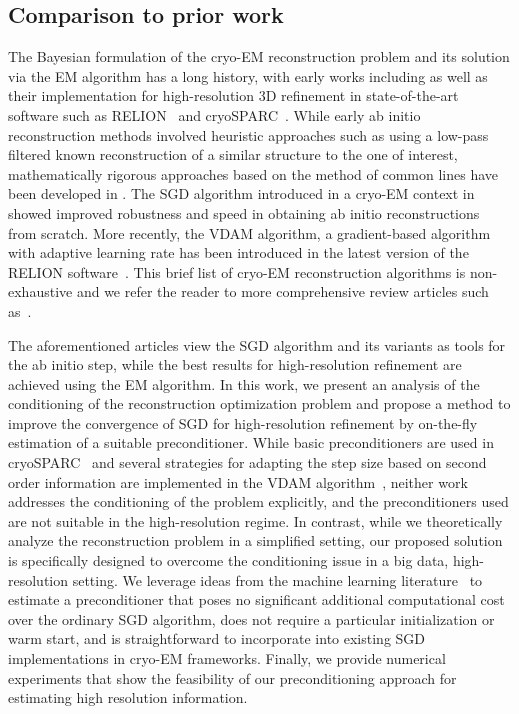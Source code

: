 \documentclass{article}
\begin{document}
\subsection{Comparison to prior work}
The Bayesian formulation of the cryo-EM reconstruction problem and its solution via the EM algorithm has a long history, with early works including \cite{sigworth_maximum-likelihood_1998,tagare_fast_2008,tagare_adaptive_2010} as well as their implementation for high-resolution 3D refinement in state-of-the-art software such as RELION~\cite{scheres_relion_2012,scheres_bayesian_2012} and cryoSPARC~\cite{punjani_cryosparc_2017}.
While early ab initio reconstruction methods involved heuristic approaches such as using a low-pass filtered known reconstruction of a similar structure to the one of interest, mathematically rigorous approaches based on the method of common lines have been developed in \cite{singer_three-dimensional_2011,shkolnisky_viewing_2012,greenberg_common_2017}.
The SGD algorithm introduced in a cryo-EM context in \cite{punjani_building_2017,punjani_cryosparc_2017} showed improved robustness and speed in obtaining ab initio reconstructions from scratch.
More recently, the VDAM algorithm, a gradient-based algorithm with adaptive learning
rate has been introduced in the latest version of the RELION software~\cite{kimanius_new_2021}.
This brief list of cryo-EM reconstruction algorithms is non-exhaustive and we refer the reader to more comprehensive review articles such as~\cite{singer_computational_2020,bendory_single-particle_2020}.

The aforementioned articles view the SGD algorithm and its variants as tools for the ab initio step, while the best results for high-resolution refinement are achieved using the EM algorithm.
In this work, we present an analysis of the conditioning of the reconstruction optimization problem and propose a method to improve the convergence of SGD for high-resolution refinement by on-the-fly estimation of a suitable preconditioner.
While basic preconditioners are used in cryoSPARC~\cite{punjani_cryosparc_2017} and several strategies for adapting the step size based on second order information are implemented in the VDAM algorithm~\cite{kimanius_new_2021}, neither work addresses the conditioning of the problem explicitly, and the preconditioners used are not suitable in the high-resolution regime.
In contrast, while we theoretically analyze the reconstruction problem in a simplified setting, our proposed solution is specifically designed to overcome the conditioning issue in a big data, high-resolution setting. 
We leverage ideas from the machine learning literature~\cite{vaswani_adaptive_2021,jahani_doubly_2022} to estimate a preconditioner that poses no significant additional computational cost over the ordinary SGD algorithm, does not require a particular initialization or warm start, and is straightforward to incorporate into existing SGD implementations in cryo-EM frameworks.
Finally, we provide numerical experiments that show the feasibility of our preconditioning approach for estimating high resolution information. 
\end{document}
